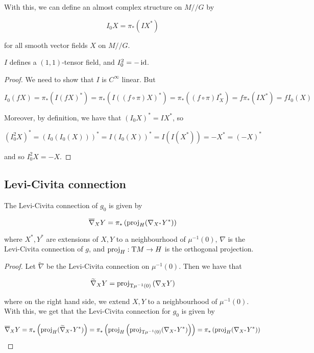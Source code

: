 \documentclass{article}
\newcommand{\sslash}{/\!/}
\begin{document}
With this, we can define an almost complex structure on \(M\sslash G\) by

\[I_0X = \pi_*(IX^*)\]

for all smooth vector fields \(X\) on \(M\sslash G\).

\begin{lemma}
    \(I\) defines a \((1, 1)\)-tensor field, and \(I_0^2 = -\operatorname{id}\).
\end{lemma}

\begin{proof}
    We need to show that \(I\) is \(C^\infty\) linear. But

    \[I_0(fX) = \pi_*(I(fX)^*) = \pi_*(I((f \circ \pi)X)^*) = \pi_*((f \circ \pi)I_X^*) = f\pi_*(IX^*) = fI_0(X)\]

    Moreover, by definition, we have that \((I_0X)^* = IX^*\), so

    \[(I_0^2X)^* = (I_0(I_0(X)))^* = I(I_0(X))^* = I(I(X^*)) = -X^* = (-X)^*\]

    and so \(I_0^2X = -X\).
\end{proof}

\subsection{Levi-Civita connection}

\begin{lemma}
    The Levi-Civita connection of \(g_0\) is given by

    \[\overline\nabla_XY = \pi_*\left(\operatorname{proj}_H(\nabla_{X^*}Y^*)\right)\]

    where \(X^*, Y^*\) are extensions of \(X, Y\) to a neighbourhood of \(\mu^{-1}(0)\), \(\nabla\) is the Levi-Civita connection of \(g\), and \(\operatorname{proj}_H : \mathrm{T} M \to H\) is the orthogonal projection.
\end{lemma}

\begin{proof}
    Let \(\widetilde\nabla\) be the Levi-Civita connection on \(\mu^{-1}(0)\). Then we have that

    \[\widetilde\nabla_XY = \operatorname{proj}_{\mathrm{T} \mu^{-1}(0)}\left(\nabla_XY\right)\]

    where on the right hand side, we extend \(X, Y\) to a neighbourhood of \(\mu^{-1}(0)\). With this, we get that the Levi-Civita connection for \(g_0\) is given by

    \[\overline\nabla_XY = \pi_*\left(\operatorname{proj}_H(\widetilde\nabla_{X^*}Y^*)\right) = \pi_*\left(\operatorname{proj}_H\left(\operatorname{proj}_{\mathrm{T}\mu^{-1}(0)}(\nabla_{X^*} Y^*)\right)\right) = \pi_*\left(\operatorname{proj}_H(\nabla_{X^*}Y^*)\right)\]
\end{proof}
\end{document}
